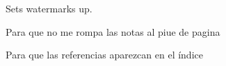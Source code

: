    Sets watermarks up.
	\usepackage{draftwatermark}				



\usepackage{etoolbox}

Para que no me rompa las notas al piue de pagina



Para que las referencias aparezcan en el índice
\usepackage[nottoc]{tocbibind}